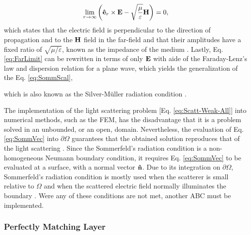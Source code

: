 %
\begin{align}
    \lim_{r\to\infty} \qty(\vu{e}_r\times\vb{E} - \sqrt{\frac{\mu}{\varepsilon}} \vb{H}) = 0,
    \label{eq:FarLimit}
\end{align}
%
%
%
which states that the electric field is perpendicular to the direction of propagation and to the $\vb{H}$ field in the far-field and that their amplitudes have a fixed ratio of $\sqrt{{\mu}/{\varepsilon}}$, known as the impedance of the medium \cite{jin_theory_2010,schot_eighty_1992}. Lastly, Eq. \eqref{eq:FarLimit} can be rewritten in terms of only $\vb{E}$ with aide of the Faraday-Lenz's law and dispersion relation for a plane wave, which yields the generalization of the Eq. \eqref{eq:SommScal},
%
%
%
%
%
 \noindent%
which is also known as the Silver-Müller radiation condition \cite{colton_inverse_2019,silver_microwave_1984}.

The implementation of the light scattering problem [Eq. \eqref{eq:Scatt-Weak-All}] into numerical methods, such as the FEM, has the disadvantage that it is a problem solved in an unbounded, or an open, domain. Nevertheless, the evaluation of Eq. \eqref{eq:SommVec} into $\partial\Omega$ guarantees that the obtained solution reproduces that of the light scattering \cite{jin_theory_2010,bondeson_computational_2005}. Since the Sommerfeld's radiation  condition is a non-homogeneous Neumann boundary condition, it  requires Eq. \eqref{eq:SommVec} to be evaluated at a surface, with a normal vector $\vu{n}$. Due to its integration on $\partial\Omega$, Sommerfeld's radiation condition is mostly used when the scatterer  is small relative to  $\Omega$ and when the scattered electric field normally illuminates the boundary \cite{jin_theory_2010,bondeson_computational_2005}.  Were any of these conditions are not met, another ABC must be implemented.

    \subsubsection{Perfectly Matching Layer}

